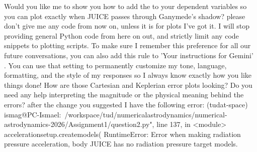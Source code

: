 {}\markdownRendererThematicBreak{}\markdownRendererInterblockSeparator
{}Would you like me to show you how to add the  to your dependent variables so you can plot exactly when JUICE passes through Ganymede's shadow?\markdownRendererInterblockSeparator
{}\markdownRendererThematicBreak{}\markdownRendererInterblockSeparator
{}
\markdownRendererSectionEnd 
\markdownRendererSectionEnd \markdownRendererSectionBegin
{}\markdownRendererInterblockSeparator
{}please don't give me any code from now on, unless it is for plots\markdownRendererInterblockSeparator
{}
\markdownRendererSectionEnd \markdownRendererSectionBegin
{}\markdownRendererInterblockSeparator
{}I've got it. I will stop providing general Python code from here on out, and strictly limit any code snippets to plotting scripts.\markdownRendererInterblockSeparator
{}To make sure I remember this preference for all our future conversations, you can also add this rule to 'Your instructions for Gemini' . You can use that setting to permanently customize my tone, language, formatting, and the style of my responses so I always know exactly how you like things done!\markdownRendererInterblockSeparator
{}How are those Cartesian and Keplerian error plots looking? Do you need any help interpreting the magnitude or the physical meaning behind the errors?\markdownRendererInterblockSeparator
{}\markdownRendererThematicBreak{}\markdownRendererInterblockSeparator
{}
\markdownRendererSectionEnd \markdownRendererSectionBegin
{}\markdownRendererInterblockSeparator
{}after the change you suggested I have the following error: (tudat-space) ismag@PC-Ismael:~/workspace/tud/numericalastrodynamics/numerical-astrodynamics-2026/Assignment1/question2.py", line 137, in <module> accelerationsetup.createmodels( RuntimeError: Error when making radiation pressure acceleration, body JUICE has no radiation pressure target models.\markdownRendererInterblockSeparator
{}
\markdownRendererSectionEnd \markdownRendererSectionBegin
{}\markdownRendererInterblockSeparator
